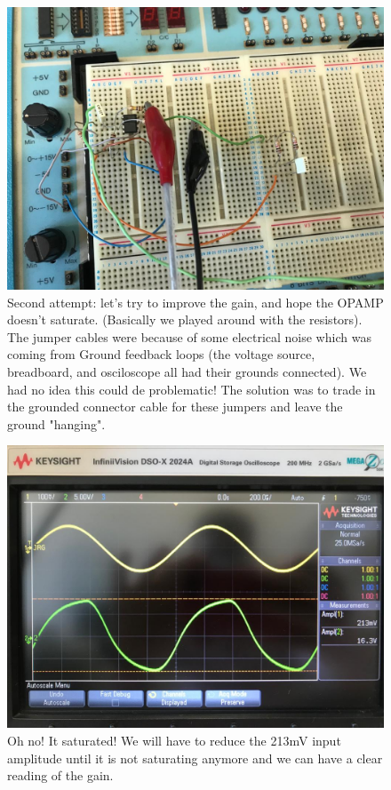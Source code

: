 \begin{figure}[H] \centering
\includegraphics[width=0.5\linewidth]{try2_diagram.jpeg}
\caption{Second attempt: let's try to improve the gain, and hope the OPAMP doesn't saturate. (Basically we played around with the resistors). The jumper cables were because of some electrical noise which was coming from Ground feedback loops (the voltage source, breadboard, and osciloscope all had their grounds connected). We had no idea this could de problematic! The solution was to trade in the grounded connector cable for these jumpers and leave the ground "hanging".}
\label{fig:t21}
\end{figure}

\begin{figure}[H] \centering
\includegraphics[width=0.5\linewidth]{saturated.jpeg}
\caption{Oh no! It saturated! We will have to reduce the 213mV input amplitude until it is not saturating anymore and we can have a clear reading of the gain.}
\label{fig:t3}
\end{figure}


